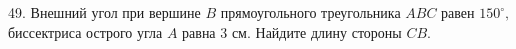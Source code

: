 49. Внешний угол при вершине $B$ прямоугольного треугольника $ABC$ равен $150^\circ,$ биссектриса острого угла $A$ равна 3 см. Найдите длину стороны $CB.$\\
